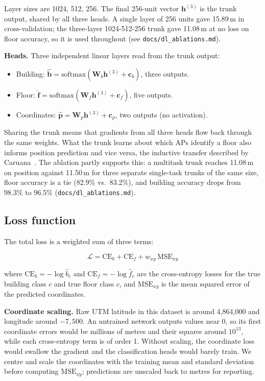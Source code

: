 \documentclass[conference]{IEEEtran}
\begin{document}
Layer sizes are 1024, 512, 256. The final 256-unit vector $\mathbf{h}^{(3)}$ is the trunk output,
shared by all three heads. A single layer of 256 units gave 15.89\,m in cross-validation; the
three-layer 1024-512-256 trunk gave 11.08\,m at no loss on floor accuracy, so it is used
throughout (see \texttt{docs/dl\_ablations.md}).

\textbf{Heads.} Three independent linear layers read from the trunk output:

\begin{itemize}
  \item Building: $\hat{\mathbf{b}} = \mathrm{softmax}(\mathbf{W}_b \mathbf{h}^{(3)} + \mathbf{c}_b)$,
        three outputs.
  \item Floor: $\hat{\mathbf{f}} = \mathrm{softmax}(\mathbf{W}_f \mathbf{h}^{(3)} + \mathbf{c}_f)$,
        five outputs.
  \item Coordinates: $\hat{\mathbf{p}} = \mathbf{W}_p \mathbf{h}^{(3)} + \mathbf{c}_p$,
        two outputs (no activation).
\end{itemize}

Sharing the trunk means that gradients from all three heads flow back through the same weights.
What the trunk learns about which APs identify a floor also informs position prediction and vice
versa, the inductive transfer described by Caruana~\cite{caruana1997mtl}. The ablation partly
supports this: a multitask trunk reaches 11.08\,m on position against 11.50\,m for three separate
single-task trunks of the same size, floor accuracy is a tie (82.9\% vs.\ 83.2\%), and building
accuracy drops from 98.3\% to 96.5\% (\texttt{docs/dl\_ablations.md}).

\subsection{Loss function}

The total loss is a weighted sum of three terms:

\begin{equation}
  \mathcal{L} = \mathrm{CE}_b + \mathrm{CE}_f + w_{xy}\,\mathrm{MSE}_{xy}
  \label{eq:loss}
\end{equation}

where $\mathrm{CE}_b = -\log \hat{b}_c$ and $\mathrm{CE}_f = -\log \hat{f}_c$ are the
cross-entropy losses for the true building class $c$ and true floor class $c$, and
$\mathrm{MSE}_{xy}$ is the mean squared error of the predicted coordinates.

\textbf{Coordinate scaling.} Raw UTM latitude in this dataset is around 4{,}864{,}000 and
longitude around $-7{,}500$. An untrained network outputs values near 0, so its first coordinate
errors would be millions of metres and their squares around $10^{13}$, while each cross-entropy
term is of order 1. Without scaling, the coordinate loss would swallow the gradient and the
classification heads would barely train. We
centre and scale the coordinates with the training mean and standard deviation before computing
$\mathrm{MSE}_{xy}$; predictions are unscaled back to metres for reporting.
\end{document}
